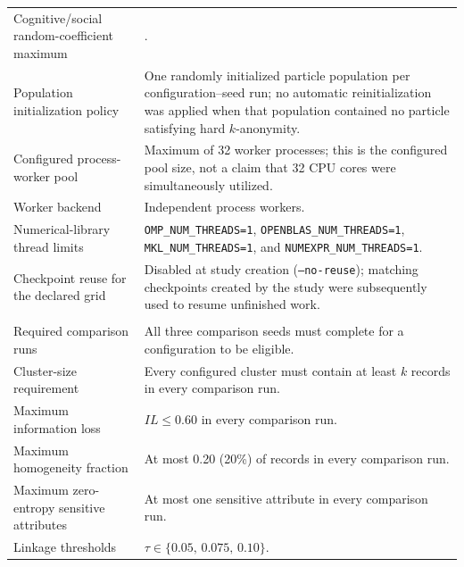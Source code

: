 \documentclass[12pt,a4paper]{article}
\begin{document}
\begin{longtable}{
        @{}
        >{\raggedright\arraybackslash}p{}
        >{\raggedright\arraybackslash}p{}
        @{}
    }
    Cognitive/social random-coefficient maximum
    & 0.01. \\

    Population initialization policy
    & One randomly initialized particle population per configuration--seed
    run; no automatic reinitialization was applied when that population
    contained no particle satisfying hard $k$-anonymity. \\

    Configured process-worker pool
    & Maximum of 32 worker processes; this is the configured pool size, not a
    claim that 32 CPU cores were simultaneously utilized. \\

    Worker backend
    & Independent process workers. \\

    Numerical-library thread limits
    & \texttt{OMP\_NUM\_THREADS=1},
    \texttt{OPENBLAS\_NUM\_THREADS=1},
    \texttt{MKL\_NUM\_THREADS=1}, and
    \texttt{NUMEXPR\_NUM\_THREADS=1}. \\

    Checkpoint reuse for the declared grid
    & Disabled at study creation (\texttt{--no-reuse}); matching checkpoints
    created by the study were subsequently used to resume unfinished work. \\

    \midrule
    \multicolumn{2}{@{}l}{\textbf{Screening settings}}\\*
    \midrule

    Required comparison runs
    & All three comparison seeds must complete for a configuration to be
    eligible. \\

    Cluster-size requirement
    & Every configured cluster must contain at least $k$ records in every
    comparison run. \\

    Maximum information loss
    & $IL\leq0.60$ in every comparison run. \\

    Maximum homogeneity fraction
    & At most 0.20 (20\%) of records in every comparison run. \\

    Maximum zero-entropy sensitive attributes
    & At most one sensitive attribute in every comparison run. \\

    Linkage thresholds
    & $\tau\in\{0.05,\,0.075,\,0.10\}$. \\


\end{longtable}
\end{document}
